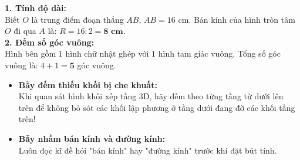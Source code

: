 \documentclass[12pt,a4paper]{article}
\begin{document}
\vspace{-2.5mm}
\noindent
\begin{minipage}[t]{0.49\textwidth}\vspace{0pt}
\begin{tcolorbox}[
  enhanced,
  colback=green!4!white,
  colframe=green!60!black,
  arc=2mm, boxrule=0.8pt,
  left=2mm, right=2mm, top=1.8mm, bottom=1.8mm,
  title={\footnotesize\bfseries\color{white}\faCheckCircle\ Ví dụ thực hành chuẩn mực}
]
{\footnotesize
\textbf{1. Tính độ dài:}\\
Biết $O$ là trung điểm đoạn thẳng $AB$, $AB = 16\text{ cm}$. Bán kính của hình tròn tâm $O$ đi qua $A$ là: $R = 16 : 2 = \mathbf{8\text{ cm}}$.\\
\textbf{2. Đếm số góc vuông:}\\
Hình bên gồm $1$ hình chữ nhật ghép với $1$ hình tam giác vuông. Tổng số góc vuông là: $4 + 1 = \mathbf{5}$ góc vuông.
}
\end{tcolorbox}
\end{minipage}
\hfill
\begin{minipage}[t]{0.49\textwidth}\vspace{0pt}
\begin{tcolorbox}[
  enhanced,
  colback=red!4!white,
  colframe=red!70!black,
  arc=2mm, boxrule=0.8pt,
  left=2mm, right=2mm, top=1.8mm, bottom=1.8mm,
  title={\footnotesize\bfseries\color{white}\faExclamationTriangle\ Mẹo tránh bẫy trắc nghiệm}
]
{\footnotesize
\begin{itemize}\setlength{\itemsep}{1.5pt}\setlength{\leftskip}{-2.5mm}
  \item \textbf{Bẫy đếm thiếu khối bị che khuất:}\\
  Khi quan sát hình khối xếp tầng 3D, hãy đếm theo từng tầng từ dưới lên trên để không bỏ sót các khối lập phương ở tầng dưới đang đỡ các khối tầng trên!
  \item \textbf{Bẫy nhầm bán kính và đường kính:}\\
  Luôn đọc kĩ đề hỏi "bán kính" hay "đường kính" trước khi đặt bút tính.
\end{itemize}
}
\end{tcolorbox}
\end{minipage}
\end{document}
